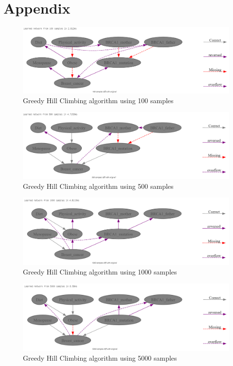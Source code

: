 \documentclass{article}
\begin{document}
\section{Appendix} \label{appendix:raw}
\begin{figure}[H]
    \centering
    \includegraphics[width=\textwidth]{../figures/greedy_hill_100.png}
    \caption{Greedy Hill Climbing algorithm using 100 samples}
    \label{fig:ghc100}
\end{figure}
\begin{figure}[H]
    \centering
    \includegraphics[width=\textwidth]{../figures/greedy_hill_500.png}
    \caption{Greedy Hill Climbing algorithm using 500 samples}
    \label{fig:ghc500}
\end{figure}
\begin{figure}[H]
    \centering
    \includegraphics[width=\textwidth]{../figures/greedy_hill_1000.png}
    \caption{Greedy Hill Climbing algorithm using 1000 samples}
    \label{fig:ghc1000}
\end{figure}
\begin{figure}[H]
    \centering
    \includegraphics[width=\textwidth]{../figures/greedy_hill_5000.png}
    \caption{Greedy Hill Climbing algorithm using 5000 samples}
    \label{fig:ghc5000}
\end{figure}
\end{document}
